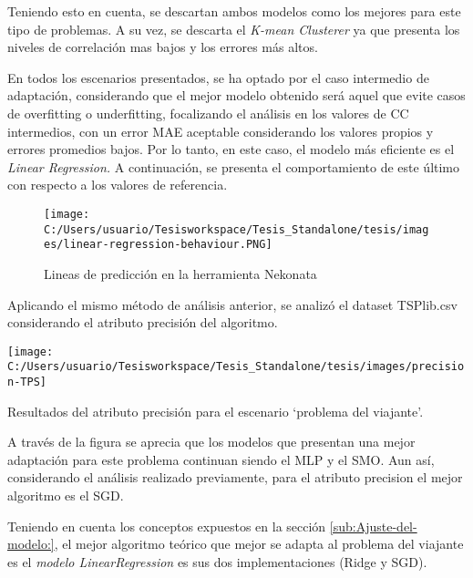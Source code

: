 Teniendo esto en cuenta, se descartan ambos modelos como los mejores
para este tipo de problemas. A su vez, se descarta el \emph{K-mean
Clusterer }ya que presenta los niveles de correlación mas bajos y
los errores más altos.

En todos los escenarios presentados, se ha optado por el caso intermedio
de adaptación, considerando que el mejor modelo obtenido será aquel
que evite casos de overfitting o underfitting, focalizando el análisis
en los valores de \ac{CC} intermedios, con un error \ac{MAE} aceptable
considerando los valores propios y errores promedios bajos. Por lo
tanto, en este caso, el modelo más eficiente es el \emph{Linear Regression.
}A continuación, se presenta el comportamiento de este último con
respecto a los valores de referencia.

\begin{figure}[H]
\begin{centering}
\texttt{[image: C:/Users/usuario/Tesisworkspace/Tesis\_Standalone/tesis/images/linear-regression-behaviour.PNG]}
\par\end{centering}

\caption{Lineas de predicción en la herramienta Nekonata}
\end{figure}


Aplicando el mismo método de análisis anterior, se analizó el dataset
TSPlib.csv considerando el atributo precisión del algoritmo.

\begin{table}[H]
\begin{centering}
\texttt{[image: C:/Users/usuario/Tesisworkspace/Tesis\_Standalone/tesis/images/precision-TPS]}
\par\end{centering}

\caption{Resultados del atributo precisión para el escenario ‘problema del
viajante’.}
\end{table}


A través de la figura se aprecia que los modelos que presentan una
mejor adaptación para este problema continuan siendo el \ac{MLP}
y el \ac{SMO}. Aun así, considerando el análisis realizado previamente,
para el atributo precision el mejor algoritmo es el \ac{SGD}. 

Teniendo en cuenta los conceptos expuestos en la sección \ref{sub:Ajuste-del-modelo:},
el mejor algoritmo teórico que mejor se adapta al problema del viajante
es el \emph{modelo LinearRegression }es sus dos implementaciones (Ridge
y \ac{SGD}). 

